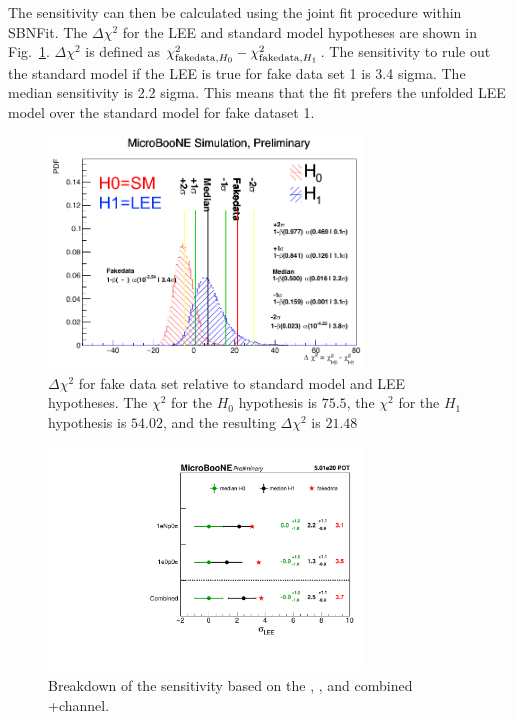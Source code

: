 The sensitivity can then be calculated using the joint fit procedure within SBNFit. The $\Delta \chi^{2}$ for the LEE and standard model hypotheses are shown in Fig.~\ref{fig:fakedata:set1:sens}.  $\Delta \chi^{2}$ is defined as $\chi^{2}_{{\rm fakedata}, H_{0}}-\chi^{2}_{{\rm fakedata}, H_{1}}$. The sensitivity to rule out the standard model if the LEE is true for fake data set 1 is 3.4 sigma.  The median sensitivity is 2.2 sigma. This means that the fit prefers the unfolded LEE model over the standard model for fake dataset 1.

\begin{figure}[H]
\begin{center}
\includegraphics[width=0.75\textwidth]{Fakedata/set1/sens.pdf}
\caption{\label{fig:fakedata:set1:sens} $\Delta \chi^{2}$ for fake data set relative to standard model and LEE hypotheses. The $\chi^{2}$ for the $H_0$ hypothesis is $75.5$, the $\chi^{2}$ for the $H_1$ hypothesis is $54.02$, and the resulting $\Delta \chi^{2}$ is $21.48$ }
\end{center}
\end{figure}

\begin{figure}[H]
\begin{center}
\includegraphics[width=0.75\textwidth]{Fakedata/set1/plotSig_constrained_set1.pdf}
\caption{\label{fig:fakedata:set1:combinedSig} Breakdown of the sensitivity based on the \npsel, \zpsel, and combined \npsel+\zpsel channel.}
\end{center}
\end{figure}

